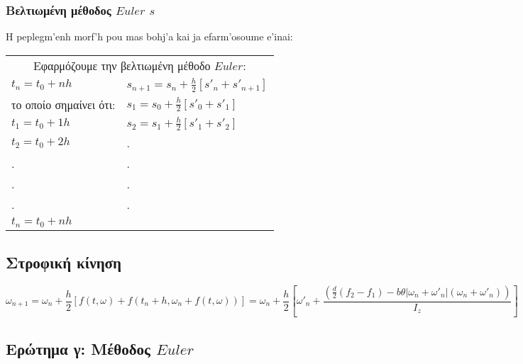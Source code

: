 \documentclass[a4paper]{article}
\begin{document}
        
        \subsubsection*{Bελτιωμένη μέθοδος $Euler$ $s$}
        H peplegm'enh morf'h pou mas bohj'a kai ja efarm'osoume e'inai:

        \begin{tabular}{l|l}
            \multicolumn{2}{c}{Εφαρμόζουμε την βελτιωμένη μέθοδο $Euler$: }\\
            $t_n=t_0+nh$ & $s_{n+1}=s_n+\frac{h}{2}[s'_n+s'_{n+1}]$\\
            το οποίο σημαίνει ότι:& $s_1=s_0+\frac{h}{2}[s'_0+s'_1]$\\
            $t_1=t_0+1h$          &$s_2=s_1+\frac{h}{2}[s'_1+s'_2]$ \\
            $t_2=t_0+2h$          & .\\
            .                     & .\\
            .                     & .\\
            .                     & .\\
            $t_n=t_0+nh$          &  \\
        \end{tabular}
        
        
        \subsection*{Στροφική κίνηση}

        \begin{dmath}
            \omega_{n+1}=\omega_n+\frac{h}{2}{[f(t, \omega)+f(t_n+h, \omega_n+f(t,\omega))]}=\omega_n+\frac{h}{2}{[\omega'_n+\frac{(\frac{d}{2}(f_2-f_1)-b\theta \lvert\omega_n+\omega'_n\rvert(\omega_n+\omega'_n))}{I_z}]}
        \end{dmath}
        \subsection{Eρώτημα γ: Μέθοδος $Euler$}
\end{document}
